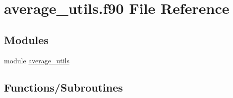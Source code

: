 \hypertarget{average__utils_8f90}{}\section{average\+\_\+utils.\+f90 File Reference}
\label{average__utils_8f90}
\subsection*{Modules}
\begin{DoxyCompactItemize}
\item 
module \hyperlink{namespaceaverage__utils}{average\+\_\+utils}
\end{DoxyCompactItemize}
\subsection*{Functions/\+Subroutines}
